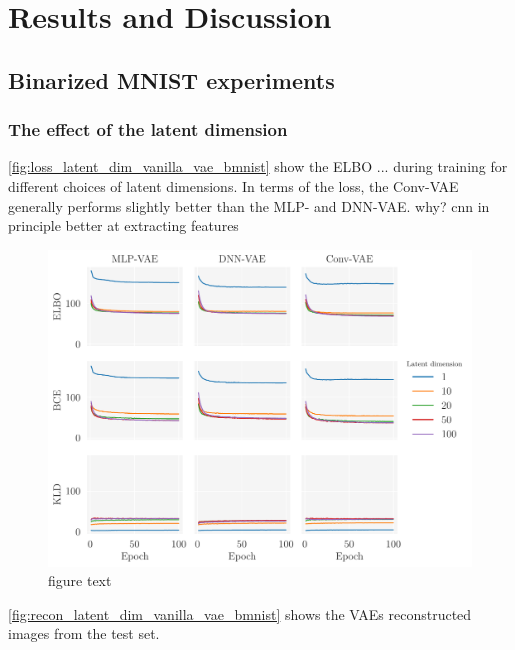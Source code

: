 \newpage
\section{Results and Discussion}\label{sec:Results}

\subsection{Binarized MNIST experiments}

\subsubsection{The effect of the latent dimension}  

\autoref{fig:loss_latent_dim_vanilla_vae_bmnist} show the ELBO ... during training for different choices of latent dimensions. In terms of the loss, the Conv-VAE generally performs slightly better than the MLP- and DNN-VAE.
why? cnn in principle better at extracting features 

\begin{figure}[!htb]
\begin{center}\includegraphics[scale=0.75]{latex/figures/loss_latent_dim_vanilla_mlp_dnn_vae_bmnist.pdf}
\end{center}
\caption{figure text}
\label{fig:loss_latent_dim_vanilla_vae_bmnist}
\end{figure}

\autoref{fig:recon_latent_dim_vanilla_vae_bmnist} shows the VAEs reconstructed images from the test set.

